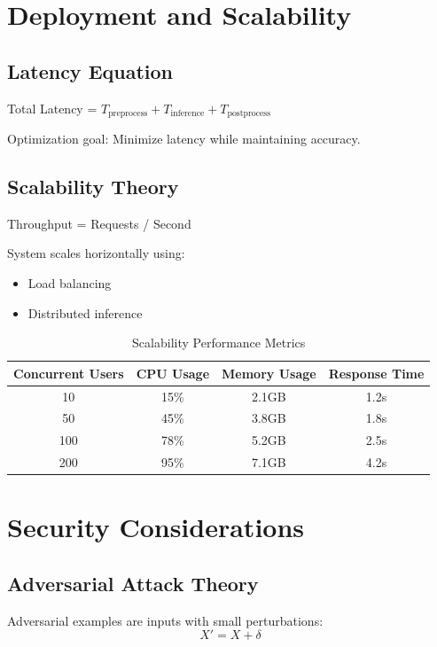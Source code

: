 \documentclass[journal,twocolumn,10pt]{IEEEtran}
\begin{document}
\section{Deployment and Scalability}

\subsection{Latency Equation}
Total Latency = $T_{\text{preprocess}} + T_{\text{inference}} + T_{\text{postprocess}}$

Optimization goal: Minimize latency while maintaining accuracy.

\subsection{Scalability Theory}
Throughput = Requests / Second

System scales horizontally using:
\begin{itemize}
\item Load balancing
\item Distributed inference
\end{itemize}

\begin{table}[htbp]
\centering
\caption{Scalability Performance Metrics}
\label{tab:scalability}
\begin{tabular}{cccc}
\toprule
Concurrent Users & CPU Usage & Memory Usage & Response Time \\
\midrule
10 & 15\% & 2.1GB & 1.2s \\
50 & 45\% & 3.8GB & 1.8s \\
100 & 78\% & 5.2GB & 2.5s \\
200 & 95\% & 7.1GB & 4.2s \\
\bottomrule
\end{tabular}
\end{table}

\section{Security Considerations}

\subsection{Adversarial Attack Theory}
Adversarial examples are inputs with small perturbations:
\begin{equation}
X' = X + \delta
\end{equation}
\end{document}
